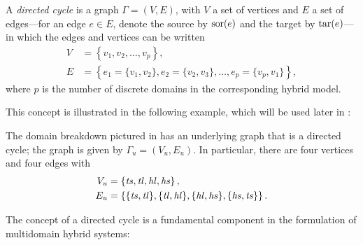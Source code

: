 \begin{definition}
  A {\em directed cycle} is a graph $\Gamma = (V, E)$, with $V$ a set of
  vertices and $E$ a set of edges---for an edge $e \in E$, denote the source by
  $\mathrm{sor}(e)$ and the target by $\mathrm{tar}(e)$---in which the edges and vertices can be
  written
  \begin{align}
    \nonumber
    V &= \left\{v_{1}, v_{2}, \ldots, v_{p}\right\},\\
    \label{eq:directedcyclep}
    E &= \left\{e_{1} = \{v_{1}, v_{2}\}, e_{2} = \{v_{2}, v_{3}\}, \ldots,
      e_{p} = \{v_{p}, v_{1}\}\right\},
  \end{align}
  where $p$ is the number of discrete domains in the corresponding hybrid
  model.
\end{definition}

This concept is illustrated in the following example, which will be used later
in :

\begin{exmp} \label{universalgraph}
  The domain breakdown pictured in  has an underlying
  graph that is a directed cycle;
  the graph is given by $\Gamma_{u} = (V_{u}, E_{u})$.
  In particular, there are four vertices and four edges with
  \begin{align}
    \nonumber
    V_u &= \left\{\mathit{ts}, \mathit{tl}, \mathit{hl}, \mathit{hs}\right\},\\
    E_u &= \left\{\{\mathit{ts}, \mathit{tl}\}, \{\mathit{tl}, \mathit{hl}\}, \{\mathit{hl}, \mathit{hs}\}, \{\mathit{hs},
      \mathit{ts}\}\right\}.
  \end{align}
\end{exmp}

The concept of a directed cycle is a fundamental component in the formulation
of multidomain hybrid systems:

